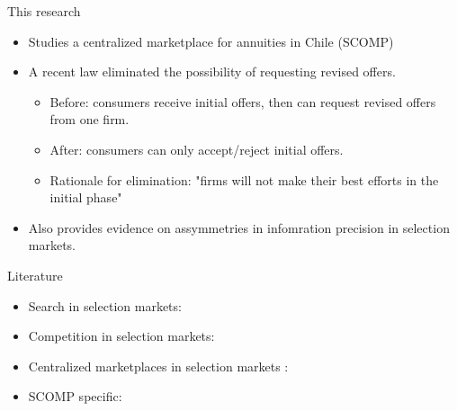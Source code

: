 \documentclass[10pt,aspectratio=169]{beamer}
\begin{document}
\begin{frame}{This research}
\begin{itemize}
    \item Studies a centralized marketplace for annuities in Chile (SCOMP)
    \item A recent law eliminated the possibility of requesting revised offers.
    \begin{itemize}
        \item Before: consumers receive initial offers, then can request revised offers from one firm.
        \item After: consumers can only accept/reject initial offers.
        \item Rationale for elimination: "firms will not make their best efforts in the initial phase"
    \end{itemize}
    \item Also provides evidence on assymmetries in infomration precision in selection markets. 
\end{itemize}
\end{frame}


\begin{frame}{Literature}
\begin{itemize}
    \item Search in selection markets: \textcite{allen_search_2019} %

    \item Competition in selection markets: \textcite{mahoney_imperfect_2017, crawford_asymmetric_2018,
    cuesta_price_2018, cosconati_competing_2025} 

    \item Centralized marketplaces in selection markets : \textcite{abaluck_when_2023,tebaldi_estimating_2025} 
    
    \item SCOMP specific: \textcite{boehm_intermediation_2024, illanes_retirement_2019, alcalde_intermediary_2021}
    

\end{itemize}
\note{
\textcolor{blue}{ ADD THE CONTRIBUTIONS TO EACH LITERATURE AND ADD MORE PAPERS}
}
\end{frame}
\end{document}
